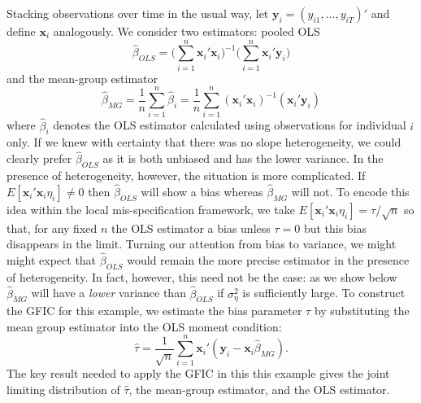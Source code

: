 Stacking observations over time in the usual way, let $\mathbf{y}_i = (y_{i1}, \ldots, y_{iT})'$ and define $\mathbf{x}_i$ analogously. 
We consider two estimators: pooled OLS
	\begin{equation}
\widehat{\beta}_{OLS} = \bigg(\sum_{i=1}^{n} \mathbf{x}_i'  \mathbf{x}_i\bigg)^{-1}\bigg(\sum_{i=1}^{n} \mathbf{x}_i' \mathbf{y}_i   \bigg)	
	\end{equation}
and the mean-group estimator
	\begin{equation}
\widehat{\beta}_{MG}  = \frac{1}{n}\sum_{i=1}^n \widehat{\beta}_i 
= \frac{1}{n} \sum_{i=1}^n \left( \mathbf{x}_i'  \mathbf{x}_i\right)^{-1}\left( \mathbf{x}_i'  \mathbf{y}_i   \right)
\end{equation}
where $\widehat{\beta}_i$ denotes the OLS estimator calculated using observations for individual $i$ only. 
If we knew with certainty that there was no slope heterogeneity, we could clearly prefer $\widehat{\beta}_{OLS}$ as it is both unbiased and has the lower variance.
In the presence of heterogeneity, however, the situation is more complicated.
If $E[\mathbf{x}_i' \mathbf{x}_i \eta_i]\neq 0$ then $\widehat{\beta}_{OLS}$ will show a bias whereas $\widehat{\beta}_{MG}$ will not.
To encode this idea within the local mis-specification framework, we take $E[\mathbf{x}_i'\mathbf{x}_i \eta_i] = \tau/\sqrt{n}$ so that, for any fixed $n$ the OLS estimator a bias unless $\tau = 0$ but this bias disappears in the limit.
Turning our attention from bias to variance, we might might expect that $\widehat{\beta}_{OLS}$ would remain the more precise estimator in the presence of heterogeneity.
In fact, however, this need not be the case: as we show below $\widehat{\beta}_{MG}$ will have a \emph{lower} variance than $\widehat{\beta}_{OLS}$ if $\sigma_{\eta}^2$ is sufficiently large.
To construct the GFIC for this example, we estimate the bias parameter $\tau$ by substituting the mean group estimator into the OLS moment condition:
\begin{equation}
\widehat{\tau} = \frac{1}{\sqrt{n}} \sum_{i=1}^n \mathbf{x}_i' (\mathbf{y}_i - \mathbf{x}_i \widehat{\beta}_{MG}).
\end{equation}
The key result needed to apply the GFIC in this this example gives the joint limiting distribution of $\widehat{\tau}$, the mean-group estimator, and the OLS estimator.
